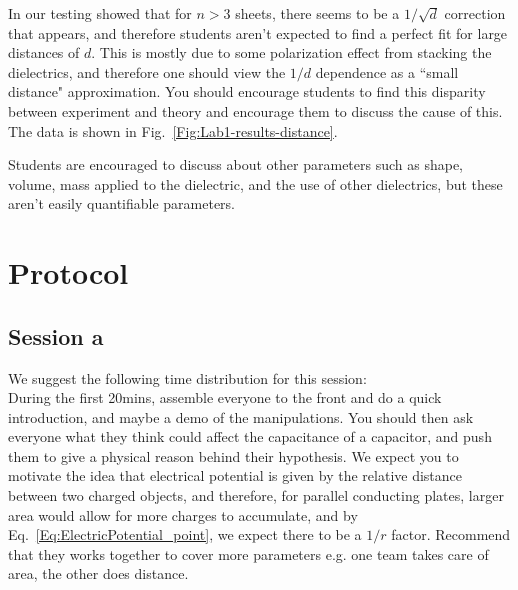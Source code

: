 \documentclass[12pt]{report}
\begin{document}
\begin{tcolorbox}
In our testing showed that for $n>3$ sheets, there seems to be a $1/\sqrt{d}$ correction that appears, and therefore students aren't expected to find a perfect fit for large distances of $d$. This is mostly due to some polarization effect from stacking the dielectrics, and therefore one should view the $1/d$ dependence as a ``small distance" approximation. You should encourage students to find this disparity between experiment and theory and encourage them to discuss the cause of this. The data is shown in Fig.~\ref{Fig:Lab1-results-distance}.
\end{tcolorbox}

\begin{tcolorbox}
Students are encouraged to discuss about other parameters such as shape, volume, mass applied to the dielectric, and the use of other dielectrics, but these aren't easily quantifiable parameters.
\end{tcolorbox}



\section{Protocol}
\subsection{Session a}
\begin{tcolorbox}[title=Session \#1]
We suggest the following time distribution for this session:\\

During the first 20mins, assemble everyone to the front and do a quick introduction, and maybe a demo of the manipulations. You should then ask everyone what they think could affect the capacitance of a capacitor, and push them to give a physical reason behind their hypothesis. We expect you to motivate the idea that electrical potential is given by the relative distance between two charged objects, and therefore, for parallel conducting plates, larger area would allow for more charges to accumulate, and by Eq.~\eqref{Eq:ElectricPotential_point}, we expect there to be a $1/r$ factor. Recommend that they works together to cover more parameters e.g. one team takes care of area, the other does distance.
\end{tcolorbox}
\end{document}
